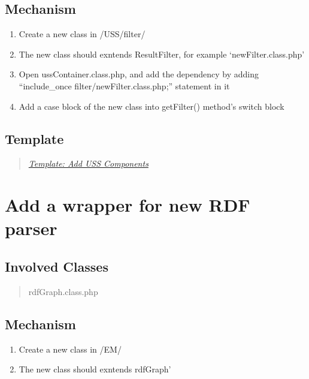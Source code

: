 \documentclass[letterpaper,10pt,english]{sphinxmanual}
\begin{document}
\subsection{Mechanism}
\label{docs/hooks/new_filter:mechanism}\begin{enumerate}
\item {} 
Create a new class in /USS/filter/

\item {} 
The new class should exntends ResultFilter, for example `newFilter.class.php'

\item {} 
Open ussContainer.class.php, and add the dependency by adding ``include\_once filter/newFilter.class.php;'' statement in it

\item {} 
Add a case block of the new class into getFilter() method's switch block

\end{enumerate}


\subsection{Template}
\label{docs/hooks/new_filter:template}\begin{quote}

{\hyperref[docs/hooks/t_uss_components:hook-template-uss]{\emph{Template: Add USS Components}}}
\end{quote}


\section{Add a wrapper for new RDF parser}
\label{docs/hooks/t_rdf_parser::doc}\label{docs/hooks/t_rdf_parser:hook-template-rdf-parser}\label{docs/hooks/t_rdf_parser:add-a-wrapper-for-new-rdf-parser}

\subsection{Involved Classes}
\label{docs/hooks/t_rdf_parser:involved-classes}\begin{quote}

rdfGraph.class.php
\end{quote}


\subsection{Mechanism}
\label{docs/hooks/t_rdf_parser:mechanism}\begin{enumerate}
\item {} 
Create a new class in /EM/

\item {} 
The new class should exntends rdfGraph'

\end{enumerate}
\end{document}
